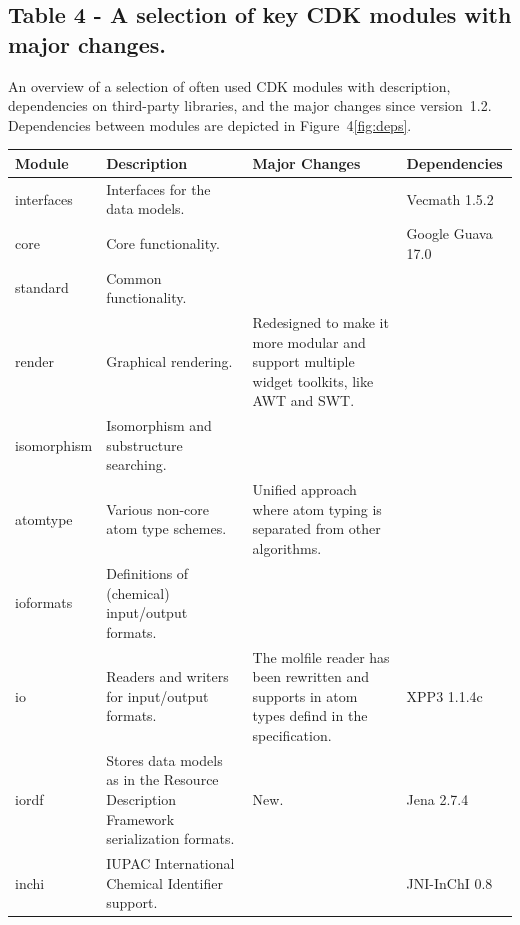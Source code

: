 \documentclass[10pt]{bmcart}
\begin{document}
\begin{backmatter}
      \subsection*{Table 4 - A selection of key CDK modules with major changes.}\label{tab:modules}
  An overview of a selection of often used CDK modules with description,
  dependencies on third-party libraries, and the major changes since
  version~1.2. Dependencies between modules are depicted in Figure~4\ref{fig:deps}.
  \baselineskip

    \begin{minipage}{1\textwidth}
    \renewcommand*{\thempfootnote}{\fnsymbol{mpfootnote}}
    \centering
    \begin{tabular}{lp{3cm}p{3cm}l}
  \textbf{Module}            & \textbf{Description}  & \textbf{Major Changes} & \textbf{Dependencies} \\ \hline
  interfaces                 & Interfaces for the data models. & & Vecmath 1.5.2 \\ \hline
  core                       & Core functionality.             & & Google Guava 17.0 \\ \hline %
  standard                   & Common functionality.           & & \\ \hline
  render                     & Graphical rendering.            & Redesigned to make it more modular and support multiple widget toolkits, like AWT and SWT. & \\ \hline
  isomorphism                & Isomorphism and substructure searching. & & \\ \hline
  atomtype                   & Various non-core atom type schemes.     & Unified approach where atom typing is separated from other algorithms. & \\ \hline
  ioformats                  & Definitions of (chemical) input/output formats. & & \\ \hline
  io                         & Readers and writers for input/output formats.  & The molfile reader has been rewritten and supports in atom types defind in the specification. & XPP3 1.1.4c \\ \hline
  iordf                      & Stores data models as in the Resource Description Framework serialization formats. & New. & Jena 2.7.4 \\ \hline
  inchi                      & IUPAC International Chemical Identifier support. & & JNI-InChI 0.8~\cite{Spjuth2013}  \\ \hline

\end{tabular}
\end{minipage}
\end{backmatter}
\end{document}
